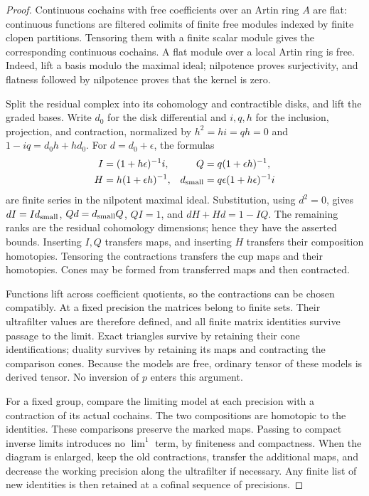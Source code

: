 \begin{proof}
Continuous cochains with free coefficients over an Artin ring $A$ are
flat: continuous functions are filtered colimits of finite free modules
indexed by finite clopen partitions.  Tensoring them with a finite
scalar module gives the corresponding continuous cochains.  A flat
module over a local Artin ring is free.  Indeed, lift a basis modulo the
maximal ideal; nilpotence proves surjectivity, and flatness followed by
nilpotence proves that the kernel is zero.

Split the residual complex into its cohomology and contractible disks,
and lift the graded bases.  Write $d_0$ for the disk differential and
$i,q,h$ for the inclusion, projection, and contraction, normalized by
$h^2=hi=qh=0$ and $1-iq=d_0h+hd_0$.  For $d=d_0+\epsilon$, the formulas
\begin{equation}\label{models:contraction}
 \begin{aligned}
 I&=(1+h\epsilon)^{-1}i,&Q&=q(1+\epsilon h)^{-1},\\
 H&=h(1+\epsilon h)^{-1},&
 d_{\rm small}&=q\epsilon(1+h\epsilon)^{-1}i
 \end{aligned}
\end{equation}
are finite series in the nilpotent maximal ideal.  Substitution, using
$d^2=0$, gives $dI=Id_{\rm small}$, $Qd=d_{\rm small}Q$, $QI=1$,
and $dH+Hd=1-IQ$.  The remaining ranks are the residual cohomology
dimensions; hence they have the asserted bounds.  Inserting $I,Q$
transfers maps, and inserting $H$ transfers their composition
homotopies.  Tensoring the contractions transfers the cup maps and
their homotopies.  Cones may be formed from transferred maps and then
contracted.

Functions lift across coefficient quotients, so the contractions can
be chosen compatibly.  At a fixed precision the matrices belong to
finite sets.  Their ultrafilter values are therefore defined, and all
finite matrix identities survive passage to the limit.  Exact
triangles survive by retaining their cone identifications; duality
survives by retaining its maps and contracting the comparison cones.
Because the models are free, ordinary tensor of these models is
derived tensor.  No inversion of $p$ enters this argument.

For a fixed group, compare the limiting model at each precision with
a contraction of its actual cochains.  The two compositions are
homotopic to the identities.  These comparisons preserve the marked
maps.  Passing to compact inverse limits introduces no $\lim^1$ term,
by finiteness and compactness.  When the diagram is enlarged, keep the
old contractions, transfer the additional maps, and decrease the
working precision along the ultrafilter if necessary.  Any finite list
of new identities is then retained at a cofinal sequence of precisions.
\end{proof}

